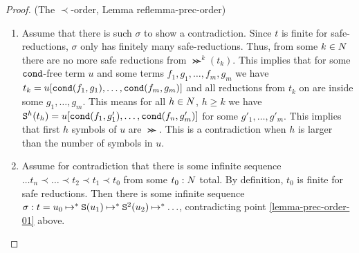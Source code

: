 \begin{proof}(The $\prec$-order, Lemma ref{lemma-prec-order})
\begin{enumerate}
\item
Assume that there is such $\sigma$ to show a contradiction. Since $t$ is finite for safe-reductions, 
$\sigma$ only has finitely many safe-reductions. 
Thus, from some $k\in{N}$ there are no more safe reductions from
$\Succ^k(t_k)$. This implies that for some ${\tt cond}$-free term 
$u$ and some terms $f_1, g_1, \ldots, f_m, g_m$ we have
$t_k = u[{\tt cond}(f_1,g_1), \ldots, {\tt cond}(f_m,g_m)]$ and all reductions from $t_k$ on are inside
some $g_1, \ldots, g_m$. This means for all $h \in {N}$, $h \ge k$ we  have
${\tt S}^{h}(t_{h}) =  u[{\tt cond}(f_1,g'_1), \ldots, {\tt cond}(f_n,g'_m)]$ for some 
$g'_1, \ldots, g'_m$. This implies that first $h$ symbols of $u$ are $\Succ$.
This is a contradiction when $h$ is larger than 
the number of symbols in $u$.

\item
Assume for contradiction that there is some infinite sequence
$\ldots t_n \prec \ldots \prec t_2 \prec t_1 \prec t_0$
from some $t_0:{N}$ total. By definition, $t_0$ is finite for safe reductions.
Then there is some infinite sequence 
$\sigma: t = u_0 \mathbin{\mapsto}^{*} {\tt S}(u_1) \mathbin{\mapsto}^{*} {\tt S}^2(u_2) \mathbin{\mapsto}^{*} \ldots$,
contradicting point \ref{lemma-prec-order-01} above.
\end{enumerate}
\end{proof}







